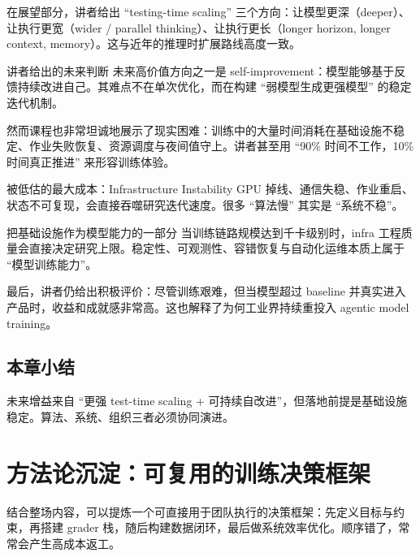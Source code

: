 \documentclass[a4paper]{article}
\begin{document}
在展望部分，讲者给出 ``testing-time scaling'' 三个方向：让模型更深（deeper）、让执行更宽（wider / parallel thinking）、让执行更长（longer horizon, longer context, memory）。这与近年的推理时扩展路线高度一致。

\begin{importantbox}{讲者给出的未来判断}
未来高价值方向之一是 self-improvement：模型能够基于反馈持续改进自己。其难点不在单次优化，而在构建 ``弱模型生成更强模型'' 的稳定迭代机制。
\end{importantbox}

然而课程也非常坦诚地展示了现实困难：训练中的大量时间消耗在基础设施不稳定、作业失败恢复、资源调度与夜间值守上。讲者甚至用 ``90\% 时间不工作，10\% 时间真正推进'' 来形容训练体验。

\begin{warningbox}{被低估的最大成本：Infrastructure Instability}
GPU 掉线、通信失稳、作业重启、状态不可复现，会直接吞噬研究迭代速度。很多 ``算法慢'' 其实是 ``系统不稳''。
\end{warningbox}

\begin{knowledgebox}{把基础设施作为模型能力的一部分}
当训练链路规模达到千卡级别时，infra 工程质量会直接决定研究上限。稳定性、可观测性、容错恢复与自动化运维本质上属于 ``模型训练能力''。
\end{knowledgebox}

最后，讲者仍给出积极评价：尽管训练艰难，但当模型超过 baseline 并真实进入产品时，收益和成就感非常高。这也解释了为何工业界持续重投入 agentic model training。

\subsection{本章小结}
未来增益来自 ``更强 test-time scaling + 可持续自改进''，但落地前提是基础设施稳定。算法、系统、组织三者必须协同演进。

\section{方法论沉淀：可复用的训练决策框架}

结合整场内容，可以提炼一个可直接用于团队执行的决策框架：先定义目标与约束，再搭建 grader 栈，随后构建数据闭环，最后做系统效率优化。顺序错了，常常会产生高成本返工。
\end{document}
